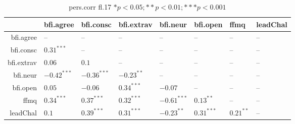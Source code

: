 \begin{table}[ht]
\centering
\begin{tabular}{rlllllll}
  \hline
 & bfi.agree & bfi.consc & bfi.extrav & bfi.neur & bfi.open & ffmq & leadChal \\ 
  \hline
bfi.agree & -- & -- & -- & -- & -- & -- & -- \\ 
  bfi.consc & $0.31^{***}$ & -- & -- & -- & -- & -- & -- \\ 
  bfi.extrav & $0.06$ & $0.1$ & -- & -- & -- & -- & -- \\ 
  bfi.neur & $-0.42^{***}$ & $-0.36^{***}$ & $-0.23^{**}$ & -- & -- & -- & -- \\ 
  bfi.open & $0.05$ & $-0.06$ & $0.34^{***}$ & $-0.07$ & -- & -- & -- \\ 
  ffmq & $0.34^{***}$ & $0.37^{***}$ & $0.32^{***}$ & $-0.61^{***}$ & $0.13^{**}$ & -- & -- \\ 
  leadChal & $0.1$ & $0.39^{***}$ & $0.31^{***}$ & $-0.23^{**}$ & $0.31^{***}$ & $0.21^{**}$ & -- \\ 
   \hline
\end{tabular}
\caption{pers.corr fl.17 $* p < 0.05; ** p < 0.01; *** p < 0.001$} 
\label{freq_corr.pers.corr.fl.17}
\end{table}

